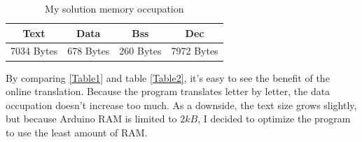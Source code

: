 \documentclass[a4paper]{article}
\begin{document}
\begin{table}[h]
  \centering
  \begin{tabular}{|| c || c || c || c ||}
    \hline
    \textbf{Text} & \textbf{Data} & \textbf{Bss} & \textbf{Dec} \\
    \hline
    7034 Bytes    & 678 Bytes     & 260 Bytes    & 7972 Bytes   \\
    \hline
  \end{tabular}
  \caption{My solution memory occupation}
  \label{Table2}
\end{table}

By comparing \autoref{Table1} and table \autoref{Table2}, it's easy to see the benefit of the online translation. Because the program translates letter by letter, the data occupation doesn't increase too much. As a downside, the text size grows slightly, but because Arduino RAM is limited to  \(2kB\), I decided to optimize the program to use the least amount of RAM.
\end{document}
